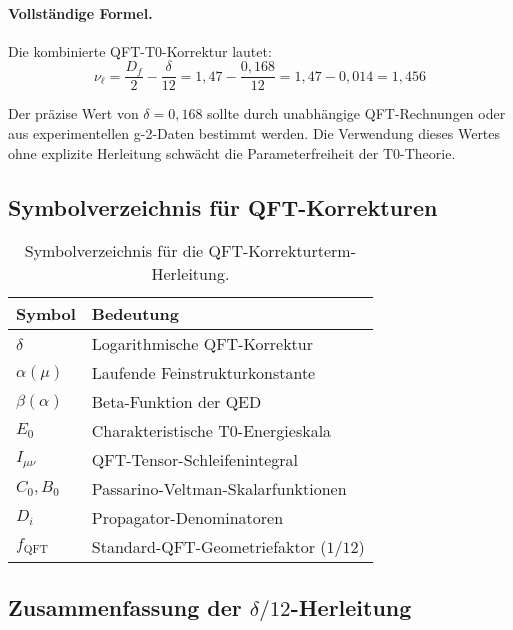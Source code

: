 \documentclass[12pt,a4paper]{article}
\theoremstyle{remark}
\begin{document}
\paragraph{Vollständige Formel.}
Die kombinierte QFT-T0-Korrektur lautet:
\begin{equation}
	\nu_\ell = \frac{D_f}{2} - \frac{\delta}{12} = 1{,}47 - \frac{0{,}168}{12} = 1{,}47 - 0{,}014 = 1{,}456
\end{equation}

\begin{important}[title=Experimentelle Bestimmung des $\delta$-Parameters]
	Der präzise Wert von $\delta = 0{,}168$ sollte durch unabhängige QFT-Rechnungen oder aus experimentellen g-2-Daten bestimmt werden. Die Verwendung dieses Wertes ohne explizite Herleitung schwächt die Parameterfreiheit der T0-Theorie.
\end{important}

\subsection{Symbolverzeichnis für QFT-Korrekturen}

\begin{table}[h]
	\centering
	\begin{tabular}{ll}
		\toprule
		\textbf{Symbol} & \textbf{Bedeutung} \\
		\midrule
		$\delta$ & Logarithmische QFT-Korrektur \\
		$\alpha(\mu)$ & Laufende Feinstrukturkonstante \\
		$\beta(\alpha)$ & Beta-Funktion der QED \\
		$E_0$ & Charakteristische T0-Energieskala \\
		$I_{\mu\nu}$ & QFT-Tensor-Schleifenintegral \\
		$C_0, B_0$ & Passarino-Veltman-Skalarfunktionen \\
		$D_i$ & Propagator-Denominatoren \\
		$f_{\text{QFT}}$ & Standard-QFT-Geometriefaktor ($1/12$) \\
		\bottomrule
	\end{tabular}
	\caption{Symbolverzeichnis für die QFT-Korrekturterm-Herleitung.}
\end{table}

\subsection{Zusammenfassung der $\delta/12$-Herleitung}
\end{document}
